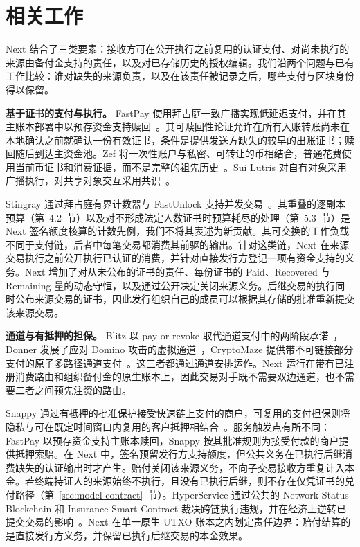 \section{相关工作}
\label{sec:related}

Next 结合了三类要素：接收方可在公开执行之前复用的认证支付、对尚未执行的来源由备付金支持的责任，以及对已存储历史的授权编辑。我们沿两个问题与已有工作比较：谁对缺失的来源负责，以及在该责任被记录之后，哪些支付与区块身份得以保留。

\noindent\textbf{基于证书的支付与执行。}
FastPay 使用拜占庭一致广播实现低延迟支付，并在其主账本部署中以预存资金支持赎回~\cite{fastpay}。其可赎回性论证允许在所有入账转账尚未在本地确认之前就确认一份有效证书，条件是提供发送方缺失的较早的出账证书；赎回随后到达主资金池。Zef 将一次性账户与私密、可转让的币相结合，普通花费使用当前币证书和消费证据，而不是完整的祖先历史~\cite{zef}。Sui Lutris 对自有对象采用广播执行，对共享对象交互采用共识~\cite{lutris}。

Stingray 通过拜占庭有界计数器与 FastUnlock 支持并发交易~\cite{stingray}。其重叠的逐副本预算（第~4.2~节）以及对不形成法定人数证书时预算耗尽的处理（第~5.3~节）是 Next 签名额度核算的计数先例，我们不将其表述为新贡献。其可交换的工作负载不同于支付链，后者中每笔交易都消费其前驱的输出。针对这类链，Next 在来源交易执行之前公开执行已认证的消费，并针对直接发行方登记一项有资金支持的义务。Next 增加了对从未公布的证书的责任、每份证书的 Paid、Recovered 与 Remaining 量的动态守恒，以及通过公开决定关闭来源义务。后继交易的执行同时公布来源交易的证书，因此发行组织自己的成员可以根据其存储的批准重新提交该来源交易。

\noindent\textbf{通道与有抵押的担保。}
Blitz 以 pay-or-revoke 取代通道支付中的两阶段承诺~\cite{blitz}，Donner 发展了应对 Domino 攻击的虚拟通道~\cite{donner}，CryptoMaze 提供带不可链接部分支付的原子多路径通道支付~\cite{cryptomaze}。这三者都通过通道安排运作。Next 运行在带有已注册消费路由和组织备付金的原生账本上，因此交易对手既不需要双边通道，也不需要二者之间预先注资的路由。

Snappy 通过有抵押的批准保护接受快速链上支付的商户，可复用的支付担保则将隐私与可在既定时间窗口内复用的客户抵押相结合~\cite{snappy,reusable}。服务触发点有所不同：FastPay 以预存资金支持主账本赎回，Snappy 按其批准规则为接受付款的商户提供抵押索赔。在 Next 中，签名预留发行方支持额度，但公共义务在已执行后继消费缺失的认证输出时才产生。赔付关闭该来源义务，不向子交易接收方重复计入本金。若终端持证人的来源始终不执行，且没有已执行后继，则不存在仅凭证书的兑付路径（第~\ref{sec:model-contract}~节）。HyperService 通过公共的 Network Status Blockchain 和 Insurance Smart Contract 裁决跨链执行违规，并在经济上逆转已提交交易的影响~\cite{web3}。Next 在单一原生 UTXO 账本之内划定责任边界：赔付结算的是直接发行方义务，并保留已执行后继交易的本金效果。

